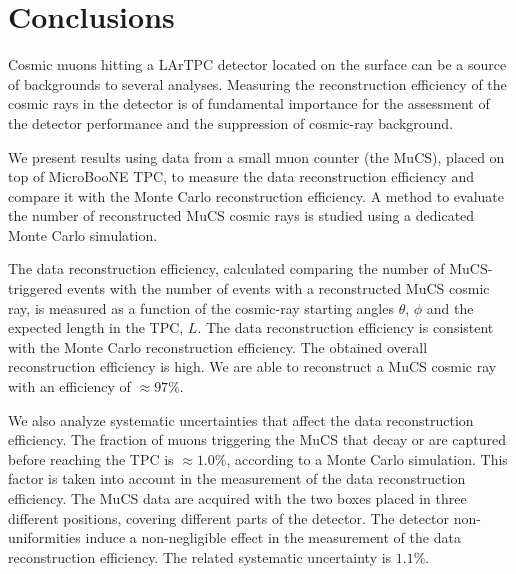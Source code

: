 \documentclass[a4paper,11pt]{article}
\begin{document}
\section{Conclusions}
Cosmic muons hitting a LArTPC detector located on the surface can be a source of backgrounds to several analyses. Measuring the reconstruction efficiency of the cosmic rays in the detector is of fundamental importance for the assessment of the detector performance and the suppression of cosmic-ray background.

We present results using data from a small muon counter (the MuCS), placed on top of MicroBooNE TPC, to measure the data reconstruction efficiency and compare it with the Monte Carlo reconstruction efficiency.
A method to evaluate the number of reconstructed MuCS cosmic rays is studied using a dedicated Monte Carlo simulation.

The data reconstruction efficiency, calculated comparing the number of MuCS-triggered events with the number of events with a reconstructed MuCS cosmic ray, is measured as a function of the cosmic-ray starting angles $\theta$, $\phi$ and the expected length in the TPC, $L$. The data reconstruction efficiency is consistent with the Monte Carlo reconstruction efficiency. The obtained overall reconstruction efficiency is high. We are able to reconstruct a MuCS cosmic ray with an efficiency of $\approx97\%$.

We also analyze systematic uncertainties that affect the data reconstruction efficiency. The fraction of muons triggering the MuCS that decay or are captured before reaching the TPC is $\approx1.0\%$, according to a Monte Carlo simulation.  This factor is taken into account in the measurement of the data reconstruction efficiency.
The MuCS data are acquired with the two boxes placed in three different positions, covering different parts of the detector. The detector non-uniformities induce a non-negligible effect in the measurement of the data reconstruction efficiency. The related systematic uncertainty is $1.1\%$.
\end{document}
